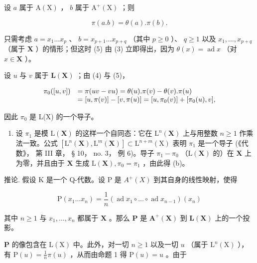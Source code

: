 设 \(a\) 属于 \(\mathrm{A}(\mathrm{X})\) ， \(b\) 属于 \(\mathrm{A}^{+}(\mathrm{X})\) ；则

\[
\pi (a. b) = \theta (a). \pi (b).\tag{5}
\]

只需考虑 \(a = x_{1} \ldots x_{p}\) 、 \(b = x_{p+1} \ldots x_{p+q}\) （其中 \(p \geqslant 0\) ）、 \(q \geqslant 1\) 以及 \(x_{1}, \ldots, x_{p+q}\) （属于 \(\mathbf{X}\) ）的情形；但这时 (5) 由 (3) 立即得出，因为 \(\theta(x) = \operatorname{ad} x\) （对 \(x \in \mathbf{X}\) ）。

设 \(u\) 与 \(v\) 属于 \(\mathbf{L}(\mathbf{X})\) ；由 (4) 与 (5)，

\[
\begin{array}{r l} \pi_ {0} ([ u, v ]) & = \pi (u v - v u) = \theta (u). \pi (v) - \theta (v). \pi (u) \\ & = [ u, \pi (v) ] - [ v, \pi (u) ] = [ u, \pi_ {0} (v) ] + [ \pi_ {0} (u), v ], \end{array}
\]

因此 \(\pi_0\) 是 L(X) 的一个导子。

\begin{enumerate}
\def\labelenumi{(\alph{enumi})}
\setcounter{enumi}{1}
\tightlist
\item
  设 \(\pi_1\) 是模 \(\mathrm{L}(\mathbf{X})\) 的这样一个自同态：它在 \(\mathrm{L}^n (\mathbf{X})\) 上与用整数 \(n\geqslant 1\) 作乘法一致。公式 \([\mathrm{L}^n (\mathbf{X}),\mathrm{L}^m (\mathbf{X})]\subset \mathrm{L}^{n + m}(\mathrm{X})\) 表明 \(\pi_{1}\) 是一个导子 (《代数》， 第 III 章， § 10， no. 3， 例 6)。导子 \(\pi_1 - \pi_0\) （\(\mathrm{L}(\mathbf{X})\) 的）在 \(\mathbf{X}\) 上为零，并且由于 \(\mathbf{X}\) 生成 \(\mathrm{L}(\mathbf{X}),\pi_0 = \pi_1\) ，由此得 (b)。
\end{enumerate}

推论. 假设 K 是一个 Q-代数。设 P 是 \(A^{+}(X)\) 到其自身的线性映射，使得

\[
\mathrm{P} \left(x _ {1} \dots x _ {n}\right) = \frac {1}{n} (\operatorname{ad} x _ {1} \circ \dots \circ \operatorname{ad} x _ {n - 1}) (x _ {n})\tag{6}
\]

其中 \(n \geqslant 1\) 与 \(x_1, \ldots, x_n\) 都属于 \(\mathbf{X}\) 。那么 \(\mathbf{P}\) 是 \(\mathbf{A}^+(\mathbf{X})\) 到 \(\mathbf{L}(\mathbf{X})\) 上的一个投影。

\(\mathbf{P}\) 的像包含在 \(\mathrm{L}(\mathrm{X})\) 中。此外，对一切 \(n \geqslant 1\) 以及一切 \(u\) （属于 \(\mathrm{L}^n (\mathrm{X})\) ），有 \(\mathrm{P}(u) = \frac{1}{n}\pi (u)\) ，从而由命题 1 得 \(\mathrm{P}(u) = u\) 。由于

